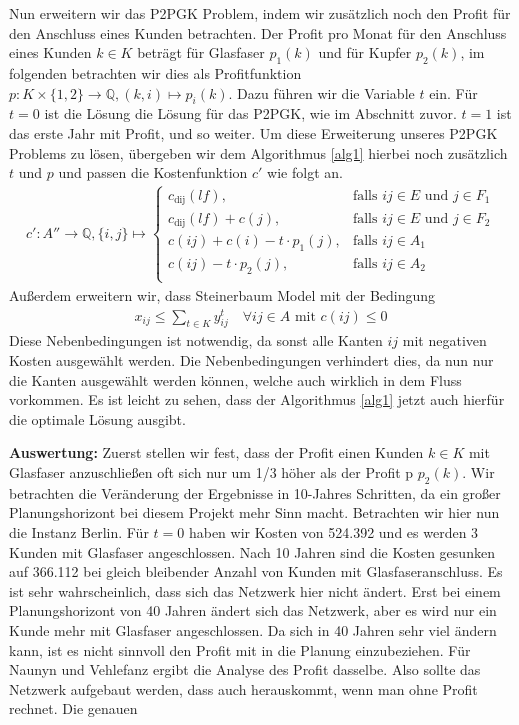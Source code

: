 \documentclass[11pt,a4paper]{article}
\newcommand{\Q}{\mathbb{Q}}
\theoremstyle{my_th_style1}
\begin{document}
Nun erweitern wir das P2PGK Problem, indem wir zusätzlich noch den Profit für den Anschluss eines Kunden  betrachten.
Der Profit pro Monat für den Anschluss eines Kunden $k \in K$ beträgt für Glasfaser $p_1(k)$ und für Kupfer $p_2(k)$, im folgenden betrachten wir dies als Profitfunktion $p:K \times \{1,2\} \rightarrow \Q,(k,i) \mapsto p_i(k)$. Dazu führen wir die Variable $t$ ein. Für $t=0$ ist die Lösung die Lösung für das P2PGK, wie im Abschnitt zuvor. $t=1$ ist das erste Jahr mit Profit, und so weiter. Um diese Erweiterung unseres P2PGK Problems zu lösen, übergeben wir dem Algorithmus  \ref{alg1} hierbei noch zusätzlich $t$ und $p$ und passen die Kostenfunktion $c'$ wie folgt an.
\begin{align*}
c': A'' \rightarrow \Q, \{ i,j \} \mapsto \left\{\begin{array}{cl} 
c_{\text{dij}}(lf), & \text{falls } ij \in E \text{ und } j \in F_1\\ 
c_{\text{dij}}(lf)+c(j), & \text{falls } ij \in E \text{ und } j \in F_2\\ 
c(ij) + c(i) - t \cdot p_1(j), & \text{falls } ij \in A_1\\ 
c(ij) - t \cdot p_2(j), & \text{falls } ij \in A_2\\ 
\end{array}
\right.
\end{align*}
Außerdem erweitern wir, dass Steinerbaum Model mit der Bedingung 
\begin{align*}
	x_{ij} \leq \displaystyle\sum_{t \in K} y_{ij}^t \quad \forall ij \in A \text{ mit } c(ij) \leq 0
\end{align*}
Diese Nebenbedingungen ist notwendig, da sonst alle Kanten $ij$ mit negativen Kosten ausgewählt werden. Die Nebenbedingungen verhindert dies, da nun nur die Kanten ausgewählt werden können, welche auch wirklich in dem Fluss vorkommen.
Es ist leicht zu sehen, dass der Algorithmus \ref{alg1} jetzt auch hierfür die optimale Lösung ausgibt. 

\textbf{Auswertung:}
Zuerst stellen wir fest, dass der Profit einen Kunden $k \in K$ mit Glasfaser anzuschließen oft sich nur um 1/3 höher als der Profit p $p_2(k)$. 
Wir betrachten die Veränderung der Ergebnisse in 10-Jahres Schritten, da ein großer Planungshorizont bei diesem Projekt mehr Sinn macht.
Betrachten wir hier nun die Instanz Berlin. Für $t=0$ haben wir Kosten von 524.392 und es werden 3 Kunden mit Glasfaser angeschlossen. Nach 10 Jahren sind die Kosten gesunken auf 366.112 bei gleich bleibender Anzahl von Kunden mit Glasfaseranschluss. Es ist sehr wahrscheinlich, dass sich das Netzwerk hier nicht ändert. Erst bei einem Planungshorizont von 40 Jahren ändert sich das Netzwerk, aber es wird nur ein Kunde mehr mit Glasfaser angeschlossen. Da sich in 40 Jahren sehr viel ändern kann, ist es nicht sinnvoll den Profit mit in die Planung einzubeziehen. Für Naunyn und Vehlefanz ergibt die Analyse des Profit dasselbe. Also sollte das Netzwerk aufgebaut werden, dass auch herauskommt, wenn man ohne Profit rechnet. Die genauen 
\end{document}
